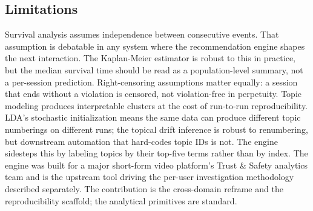 \documentclass{obelus-preprint}
\begin{document}
\subsection{Limitations}
Survival analysis assumes independence between consecutive events. That assumption is debatable in any system where the recommendation engine shapes the next interaction. The Kaplan-Meier estimator is robust to this in practice, but the median survival time should be read as a population-level summary, not a per-session prediction. Right-censoring assumptions matter equally: a session that ends without a violation is censored, not violation-free in perpetuity.
Topic modeling produces interpretable clusters at the cost of run-to-run reproducibility. LDA's stochastic initialization means the same data can produce different topic numberings on different runs; the topical drift inference is robust to renumbering, but downstream automation that hard-codes topic IDs is not. The engine sidesteps this by labeling topics by their top-five terms rather than by index.
The engine was built for a major short-form video platform's Trust \& Safety analytics team and is the upstream tool driving the per-user investigation methodology described separately. The contribution is the cross-domain reframe and the reproducibility scaffold; the analytical primitives are standard.
\end{document}
